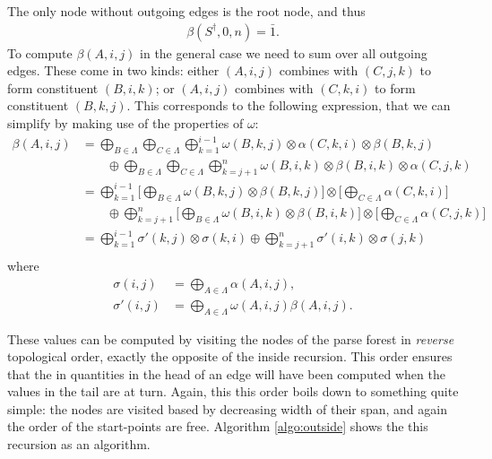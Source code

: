   The only node without outgoing edges is the root node, and thus
  \begin{align*}
    \beta(S^{\dagger}, 0, n) = \bar{1}.
  \end{align*}
  To compute $\beta(A, i, j)$ in the general case we need to sum over all outgoing edges. These come in two kinds: either $(A, i, j)$ combines with $(C, j, k)$ to form constituent $(B, i, k)$; or $(A, i, j)$ combines with $(C, k, i)$ to form constituent $(B, k, j)$. This corresponds to the following expression, that we can simplify by making use of the properties of $\omega$:
  \begin{align*}
    \beta(A, i, j)
      &= \bigoplus_{B \in \Lambda} \bigoplus_{C \in \Lambda} \bigoplus_{k=1}^{i-1} \omega(B, k, j) \otimes \alpha(C, k, i) \otimes \beta(B, k, j) \\
        &\qquad \oplus \bigoplus_{B \in \Lambda} \bigoplus_{C \in \Lambda} \bigoplus_{k=j+1}^{n} \omega(B, i, k) \otimes \beta(B, i, k) \otimes \alpha(C, j, k) \\
      &=  \bigoplus_{k=1}^{i-1}  \Bigg[ \bigoplus_{B \in \Lambda} \omega(B, k, j)  \otimes \beta(B, k, j) \Bigg] \otimes \Bigg[ \bigoplus_{C \in \Lambda} \alpha(C, k, i) \Bigg] \\
        &\qquad \oplus \bigoplus_{k=j+1}^{n}  \Bigg[ \bigoplus_{B \in \Lambda}  \omega(B, i, k) \otimes \beta(B, i, k) \Bigg] \otimes  \Bigg[  \bigoplus_{C \in \Lambda} \alpha(C, j, k) \Bigg] \\
      &=  \bigoplus_{k=1}^{i-1}  \sigma'(k, j) \otimes \sigma(k, i) \oplus \bigoplus_{k=j+1}^{n} \sigma'(i, k) \otimes  \sigma(j, k) \\
  \end{align*}
  where
  \begin{align*}
      \sigma(i, j) &= \bigoplus_{A \in \Lambda} \alpha(A, i, j),  \\
      \sigma'(i, j) &= \bigoplus_{A \in \Lambda} \omega(A, i, j) \beta(A, i, j).
  \end{align*}

  These values can be computed by visiting the nodes of the parse forest in \textit{reverse} topological order, exactly the opposite of the inside recursion. This order ensures that the in quantities in the head of an edge will have been computed when the values in the tail are at turn. Again, this this order boils down to something quite simple: the nodes are visited based by decreasing width of their span, and again the order of the start-points are free. Algorithm \ref{algo:outside} shows the this recursion as an algorithm.


